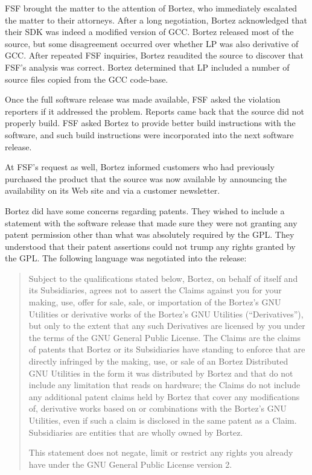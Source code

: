 FSF brought the matter to the attention of Bortez, who immediately
escalated the matter to their attorneys. After a long negotiation,
Bortez acknowledged that their SDK was indeed a modified version of
GCC\@. Bortez released most of the source, but some disagreement
occurred over whether LP was also derivative of GCC\@. After repeated
FSF inquiries, Bortez reaudited the source to discover that FSF's
analysis was correct. Bortez determined that LP included a number of
source files copied from the GCC code-base.

\label{davrik-build-problems}
Once the full software release was made available, FSF asked the violation
reporters if it addressed the problem. Reports came back that the source
did not properly build. FSF asked Bortez to provide better build
instructions with the software, and such build instructions were
incorporated into the next software release.

At FSF's request as well, Bortez informed customers who had previously
purchased the product that the source was now available by announcing
the availability on its Web site and via a customer newsletter.

Bortez did have some concerns regarding patents. They wished to include a
statement with the software release that made sure they were not granting
any patent permission other than what was absolutely required by the GPL\@.
They understood that their patent assertions could not trump any rights
granted by the GPL\@. The following language was negotiated into the release:

\begin{quotation}
Subject to the qualifications stated below, Bortez, on behalf of itself
and its Subsidiaries, agrees not to assert the Claims against you for your
making, use, offer for sale, sale, or importation of the Bortez's GNU
Utilities or derivative works of the Bortez's GNU Utilities
(``Derivatives''), but only to the extent that any such Derivatives are
licensed by you under the terms of the GNU General Public License. The
Claims are the claims of patents that Bortez or its Subsidiaries have
standing to enforce that are directly infringed by the making, use, or
sale of an Bortez Distributed GNU Utilities in the form it was distributed
by Bortez and that do not include any limitation that reads on hardware;
the Claims do not include any additional patent claims held by Bortez that
cover any modifications of, derivative works based on or combinations with
the Bortez's GNU Utilities, even if such a claim is disclosed in the same
patent as a Claim. Subsidiaries are entities that are wholly owned by
Bortez.

This statement does not negate, limit or restrict any rights you already
have under the GNU General Public License version 2.
\end{quotation}

